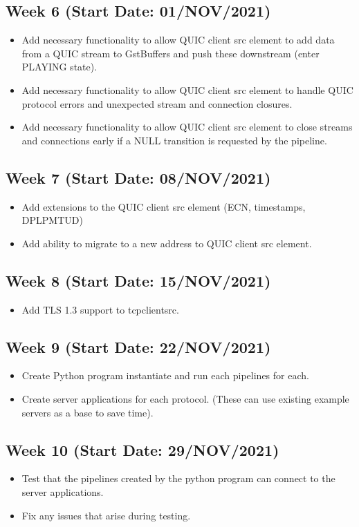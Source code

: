 \documentclass[11pt]{article}
\begin{document}
\subsection{Week 6 (Start Date: 01/NOV/2021)}
\begin{itemize}
    \item Add necessary functionality to allow QUIC client src element to add data from a QUIC stream to GstBuffers and push these downstream (enter PLAYING state).
    \item Add necessary functionality to allow QUIC client src element to handle QUIC protocol errors and unexpected stream and connection closures.
    \item Add necessary functionality to allow QUIC client src element to close streams and connections early if a NULL transition is requested by the pipeline.
\end{itemize}
\subsection{Week 7 (Start Date: 08/NOV/2021)}
\begin{itemize}
    \item Add extensions to the QUIC client src element (ECN, timestamps, DPLPMTUD)
    \item Add ability to migrate to a new address to QUIC client src element.
\end{itemize}
\subsection{Week 8 (Start Date: 15/NOV/2021)}
\begin{itemize}
    \item Add TLS 1.3 support to tcpclientsrc.
\end{itemize}
\subsection{Week 9 (Start Date: 22/NOV/2021)}
\begin{itemize}
    \item Create Python program instantiate and run each pipelines for each.
    \item Create server applications for each protocol. (These can use existing example servers as a base to save time).
\end{itemize}
\subsection{Week 10 (Start Date: 29/NOV/2021)}
\begin{itemize}
    \item Test that the pipelines created by the python program can connect to the server applications.
    \item Fix any issues that arise during testing.
\end{itemize}
\end{document}
